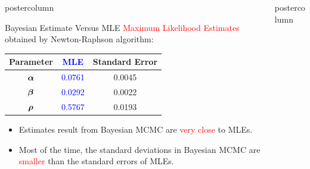 \documentclass[final]{beamer}\usepackage[]{graphicx}\usepackage[]{color}
\newcommand{\balpha}{\mbox{\boldmath $\alpha$} }
\newcommand{\bbeta}{\mbox{\boldmath $\beta$} }
\newcommand{\brho}{\mbox{\boldmath $\rho$} }
\newcommand{\red}{\textcolor{red}}
\newcommand{\blue}{\textcolor{blue}}
\newlength{\columnheight}\setlength{\columnheight}{75cm} %
\begin{document}
{\begin{frame}
\begin{columns}
\begin{column}{.33\textwidth}
\begin{beamercolorbox}[center,wd=\textwidth]{postercolumn}
\begin{minipage}[T]{.97\textwidth}
{\begin{block}{Bayesian Estimate Versus MLE}
\red{Maximum Likelihood Estimates} obtained by Newton-Raphson algorithm:
  \begin{center}
  \renewcommand\arraystretch{1.3}
  \begin{tabular}{c|cc}
  \textbf{Parameter}  & \blue{\textbf{MLE}} & \textbf{Standard Error} \\ \hline
  \large{$\balpha$}    & \blue{\large{0.0761}}     & \large{0.0045} \\ %
  \large{$\bbeta$}     & \blue{\large{0.0292}}     & \large{0.0022} \\ %
  \large{$\brho$}      & \blue{\large{0.5767}}     & \large{0.0193} \\ %
  \end{tabular}
  \end{center}
\begin{itemize}
  \item Estimates result from Bayesian MCMC are \red{very close} to MLEs. 
  \vspace{0.2cm}
  \item Most of the time, the standard deviations in Bayesian MCMC are \red{smaller} than the standard errors of MLEs.
  
\end{itemize}

\end{block}
\vfill
}

\end{minipage}
\end{beamercolorbox}
\end{column}
\begin{column}{.33\textwidth}
\begin{beamercolorbox}[center,wd=\textwidth]{postercolumn}
\begin{minipage}[T]{.97\textwidth}  %
\parbox[t][\columnheight]{\textwidth}{ %


}
\end{minipage}
\end{beamercolorbox}
\end{column}
\end{columns}
\end{frame}}
\end{document}

